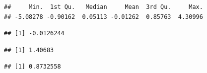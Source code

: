 \documentclass[
  paper=6in:9in,pagesize=pdftex,headinclude=on,footinclude=on,10pt]{scrbook}
\newenvironment{Shaded}{\begin{snugshade}}{\end{snugshade}}
\newcommand{\DecValTok}[1]{\textcolor[rgb]{0.00,0.00,0.81}{#1}}
\newcommand{\FunctionTok}[1]{\textcolor[rgb]{0.13,0.29,0.53}{\textbf{#1}}}
\newcommand{\NormalTok}[1]{#1}
\newcommand{\OtherTok}[1]{\textcolor[rgb]{0.56,0.35,0.01}{#1}}
\newcommand{\SpecialCharTok}[1]{\textcolor[rgb]{0.81,0.36,0.00}{\textbf{#1}}}
\begin{document}
\begin{Shaded}
\end{Shaded}

\begin{verbatim}
##     Min.  1st Qu.   Median     Mean  3rd Qu.     Max. 
## -5.08278 -0.90162  0.05113 -0.01262  0.85763  4.30996
\end{verbatim}

\begin{Shaded}
\end{Shaded}

\begin{verbatim}
## [1] -0.0126244
\end{verbatim}

\begin{Shaded}
\end{Shaded}

\begin{verbatim}
## [1] 1.40683
\end{verbatim}

\begin{Shaded}
\end{Shaded}

\begin{verbatim}
## [1] 0.8732558
\end{verbatim}
\end{document}
